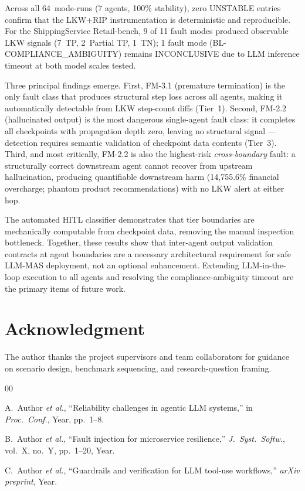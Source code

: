\documentclass[conference]{IEEEtran}
\begin{document}
Across all 64~mode-runs (7 agents, 100\% stability), zero UNSTABLE entries
confirm that the LKW+RIP instrumentation is deterministic and reproducible.
For the ShippingService Retail-bench, 9 of 11 fault modes produced observable
LKW signals (7~TP, 2~Partial TP, 1~TN); 1 fault mode
(BL-COMPLIANCE\_AMBIGUITY) remains INCONCLUSIVE due to LLM inference timeout
at both model scales tested.

Three principal findings emerge. First, FM-3.1 (premature termination) is the
only fault class that produces structural step loss across all agents, making it
automatically detectable from LKW step-count diffs (Tier~1). Second, FM-2.2
(hallucinated output) is the most dangerous single-agent fault class: it
completes all checkpoints with propagation depth zero, leaving no structural
signal --- detection requires semantic validation of checkpoint data contents
(Tier~3). Third, and most critically, FM-2.2 is also the highest-risk
\emph{cross-boundary} fault: a structurally correct downstream agent cannot
recover from upstream hallucination, producing quantifiable downstream harm
(14{,}755.6\% financial overcharge; phantom product recommendations) with no LKW
alert at either hop.

The automated HITL classifier demonstrates that tier boundaries are mechanically
computable from checkpoint data, removing the manual inspection bottleneck.
Together, these results show that inter-agent output validation contracts at
agent boundaries are a necessary architectural requirement for safe LLM-MAS
deployment, not an optional enhancement. Extending LLM-in-the-loop execution to
all agents and resolving the compliance-ambiguity timeout are the primary items
of future work.

\section*{Acknowledgment}

The author thanks the project supervisors and team collaborators for guidance
on scenario design, benchmark sequencing, and research-question framing.


\begin{thebibliography}{00}

A.~Author \textit{et al.}, ``Reliability challenges in agentic LLM systems,''
in \textit{Proc.\ Conf.}, Year, pp.~1--8.

B.~Author \textit{et al.}, ``Fault injection for microservice resilience,''
\textit{J.\ Syst.\ Softw.}, vol.~X, no.~Y, pp.~1--20, Year.

C.~Author \textit{et al.}, ``Guardrails and verification for LLM tool-use
workflows,'' \textit{arXiv preprint}, Year.

\end{thebibliography}
\end{document}
